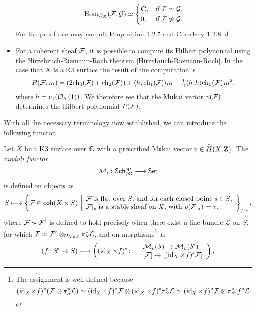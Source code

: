 \begin{itemize}[label = $\vartriangleright$]
{        \begin{equation}
            \label{eq: schur lemma for stable sheaves}
            \operatorname{Hom}_{{\mathcal{O}_{X}}}(\mathcal F, \mathcal G) \simeq \begin{cases}
                \mathbf C, &\text{if $\mathcal F \simeq \mathcal G$,} \\
                0, &\text{if $\mathcal F \not\simeq \mathcal G$.}
            \end{cases}
        \end{equation}
        For the proof one may consult Proposition 1.2.7 and Corollary 1.2.8 of \cite[Part I, \S 1.2]{HuybrechtsLehn2010}.
    }
    \item{
        For a coherent sheaf $\mathcal F$, it is possible to compute its Hilbert polynomial using the Hirzebruch-Riemann-Roch theorem \ref{Hirzebruch-Riemann-Roch}. In the case that $X$ is a K3 surface the result of the computation is
        \[
            P(\F, m) = (2\ch[0](\F) + \ch[2](\F)) + \pairing{h}{\ch[1](\F)}m + \tfrac{1}{2}\pairing{h}{h}\ch[0]{\F}m^2,
        \]
        where $h = \cclass[1](\struct{X}(1))$. We therefore see that the Mukai vector $v(\mathcal F)$ determines the Hilbert polynomial $P(\mathcal F)$. 
    }
\end{itemize}

\noindent
With all the necessary terminology now established, we can introduce the following functor. 

\begin{definition}
    \label{Definition of moduli functor}
    Let $X$ be a K3 surface over $\mathbf C$ with a prescribed Mukai vector $v \in \widetilde{H}(X, \mathbf Z)$. The \emph{moduli functor}
    \[
        \mathcal M_v \colon \mathsf{Sch}_{/\mathbf C}^{\text{op}} \longrightarrow \mathsf{Set}
    \]
    is defined on objects as 
    \[
        S \longmapsto \left\{\mathcal F \in \mathsf{coh}(X \times S) \ \middle| 
        \begin{array}{l}
            \text{$\mathcal F$ is flat over $S$, and for each closed point $s \in S$,} \\
            \text{$\mathcal F|_s$ is a stable sheaf on $X$, with $v(\mathcal F|_s) = v$.}
        \end{array}
        \right\}_{/\sim},
    \]
    where $\mathcal F \sim \mathcal F'$ is defined to hold precisely when there exist a line bundle $\mathcal L$ on $S$, for which $\mathcal F \simeq \mathcal F' \otimes_{{\mathcal{O}_{X \times S}}} \pi_S^*\mathcal L$, and on morphisms\footnote{
                    The assignment is well defined because
                    \[
                        (\operatorname{id}_{X} \times f)^*(\mathcal F \otimes \pi_S^*\mathcal L) \simeq (\operatorname{id}_{X} \times f)^*\mathcal F \otimes (\operatorname{id}_{X} \times f)^*\pi_S^*\mathcal L \simeq (\operatorname{id}_{X} \times f)^*\mathcal F \otimes \pi_{S'}^*f^*\mathcal L.
                    \]
                } as
    \[
        (f\colon S' \to S) \longmapsto \left( (\operatorname{id}_{X} \times f)^* \colon
            \begin{array}{r l}
                & \mathcal M_v(S) \to \mathcal M_v(S') \\
                & [\mathcal F] \mapsto [(\operatorname{id}_{X} \times f)^*\mathcal F]
            \end{array}
            \right).
    \]
\end{definition}

